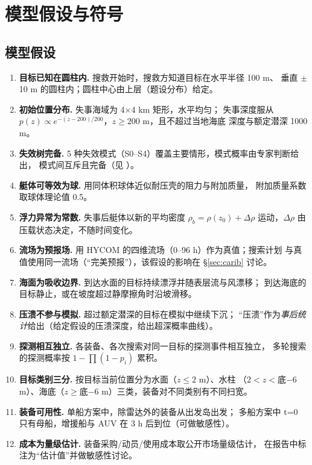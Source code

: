 \section{模型假设与符号}

\subsection{模型假设}

\begin{enumerate}[leftmargin=1.9em,itemsep=1pt]
\item[A1] \textbf{目标已知在圆柱内.} 搜救开始时，搜救方知道目标在水平半径 100 m、
      垂直 $\pm$10 m 的圆柱内；圆柱中心由上层（题设分布）给定。
\item[A2] \textbf{初始位置分布.} 失事海域为 4$\times$4 km 矩形，水平均匀；
      失事深度服从 $p(z)\propto e^{-(z-200)/200}$，$z\ge 200$ m，且不超过当地海底
      深度与额定潜深 1000 m。
\item[A3] \textbf{失效树完备.} 5 种失效模式（S0--S4）覆盖主要情形，模式概率由专家判断给出，
      模式间互斥且完备（见 ）。
\item[A4] \textbf{艇体可等效为球.} 用同体积球体近似耐压壳的阻力与附加质量，
      附加质量系数取球体理论值 0.5。
\item[A5] \textbf{浮力异常为常数.} 失事后艇体以新的平均密度
      $\rho_b=\rho(z_0)+\Delta\rho$ 运动，$\Delta\rho$ 由压载状态决定，不随时间变化。
\item[A6] \textbf{流场为预报场.} 用 HYCOM 的四维流场（0--96 h）作为真值；搜索计划
      与真值使用同一流场（“完美预报”），该假设的影响在 §\ref{sec:carib} 讨论。
\item[A7] \textbf{海面为吸收边界.} 到达水面的目标持续漂浮并随表层流与风漂移；
      到达海底的目标静止，或在坡度超过静摩擦角时沿坡滑移。
\item[A8] \textbf{压溃不参与模拟.} 超过额定潜深的目标在模拟中继续下沉；
      “压溃”作为\emph{事后统计}给出（给定假设的压溃深度，给出超深概率曲线）。
\item[A9] \textbf{探测相互独立.} 各装备、各次搜索对同一目标的探测事件相互独立，
      多轮搜索的探测概率按 $1-\prod(1-p_i)$ 累积。
\item[A10] \textbf{目标类别三分.} 按目标当前位置分为水面（$z\le2$ m）、水柱
      （$2<z<$底−6 m）、海底（$z\ge$底−6 m）三类，装备对不同类别有不同扫宽。
\item[A11] \textbf{装备可用性.} 单船方案中，除雷达外的装备从出发岛出发；
      多船方案中 t=0 只有母船，增援船与 AUV 在 3 h 后到位（可做敏感性）。
\item[A12] \textbf{成本为量级估计.} 装备采购/动员/使用成本取公开市场量级估计，
      在报告中标注为“估计值”并做敏感性讨论。
\end{enumerate}

